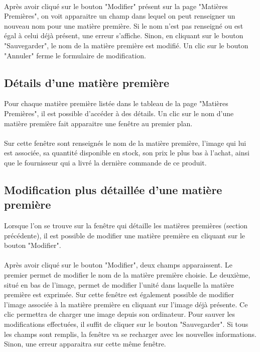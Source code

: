 \paragraph{}
Après avoir cliqué sur le bouton "Modifier" présent sur la page "Matières 
Premières", on voit apparaitre un champ dans lequel on peut renseigner un 
nouveau nom pour une matière première. Si le nom n'est pas renseigné ou est 
égal à celui déjà présent, une erreur s'affiche. Sinon, en cliquant sur le 
bouton "Sauvegarder", le nom de la matière première est modifié. Un clic sur 
le bouton "Annuler" ferme le formulaire de modification.


\subsection{Détails d'une matière première}
Pour chaque matière première listée dans le tableau de la page "Matières 
Premières", il est possible d'accéder à des détails. Un clic sur le nom d'une 
matière première fait apparaitre une fenêtre au premier plan.

\paragraph{}
Sur cette fenêtre sont renseignés le nom de la matière première, l'image qui lui 
est associée, sa quantité disponible en stock, son prix le plus bas à l'achat, 
ainsi que le fournisseur qui a livré la dernière commande de ce produit.

\subsection{Modification plus détaillée d'une matière première}
Lorsque l'on se trouve sur la fenêtre qui détaille les matières premières
(section précédente), il est possible de modifier une matière première en 
cliquant sur le bouton "Modifier".

\paragraph{}
Après avoir cliqué sur le bouton "Modifier", deux champs apparaissent. Le 
premier permet de modifier le nom de la matière première choisie. Le deuxième, 
situé en bas de l'image, permet de modifier l'unité dans laquelle la matière 
première est exprimée. Sur cette fenêtre est également possible de modifier 
l'image associée à la matière première en cliquant sur l'image déjà présente. 
Ce clic permettra de charger une image depuis son ordinateur. Pour sauver les 
modifications effectuées, il suffit de cliquer sur le bouton "Sauvegarder". Si 
tous les champs sont remplis, la fenêtre va se recharger avec les nouvelles 
informations. Sinon, une erreur apparaitra sur cette même fenêtre.

